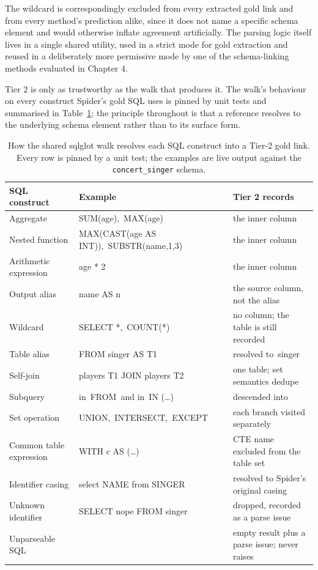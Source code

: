 The wildcard is correspondingly excluded from every extracted gold link and from every method's prediction alike, since it does not name a specific schema element and would otherwise inflate agreement artificially. The parsing logic itself lives in a single shared utility, used in a strict mode for gold extraction and reused in a deliberately more permissive mode by one of the schema-linking methods evaluated in Chapter 4.

Tier 2 is only as trustworthy as the walk that produces it. The walk's behaviour on every construct Spider's gold SQL uses is pinned by unit tests and summarised in Table~\ref{tab:3-1}; the principle throughout is that a reference resolves to the underlying schema element rather than to its surface form.

\begin{table}[htbp]
\centering
\caption{How the shared sqlglot walk resolves each SQL construct into a Tier-2 gold link. Every row is pinned by a unit test; the examples are live output against the \texttt{concert\_singer} schema.}\label{tab:3-1}
\setlength{\tabcolsep}{6pt}
\begin{tabular}{@{}>{\raggedright\arraybackslash}p{}>{\raggedright\arraybackslash}p{}>{\raggedright\arraybackslash}p{}@{}}
\toprule
\textbf{SQL construct} & \textbf{Example} & \textbf{Tier 2 records}\tabularnewline
\midrule
Aggregate & SUM(age),~MAX(age) & the inner column\tabularnewline
Nested function & MAX(CAST(age AS INT)),~SUBSTR(name,1,3) & the inner column\tabularnewline
Arithmetic expression & age * 2 & the inner column\tabularnewline
Output alias & name AS n & the source column, not the alias\tabularnewline
Wildcard & SELECT *,~COUNT(*) & no column; the table is still recorded\tabularnewline
Table alias & FROM singer AS T1 & resolved to~singer\tabularnewline
Self-join & players T1 JOIN players T2 & one table; set semantics dedupe\tabularnewline
Subquery & in~FROM~and in~IN (\ldots) & descended into\tabularnewline
Set operation & UNION,~INTERSECT,~EXCEPT & each branch visited separately\tabularnewline
Common table expression & WITH c AS (\ldots) & CTE name excluded from the table set\tabularnewline
Identifier casing & select NAME from SINGER & resolved to Spider's original casing\tabularnewline
Unknown identifier & SELECT nope FROM singer & dropped, recorded as a parse issue\tabularnewline
Unparseable SQL & & empty result plus a parse issue; never raises\tabularnewline
\bottomrule
\end{tabular}
\end{table}




